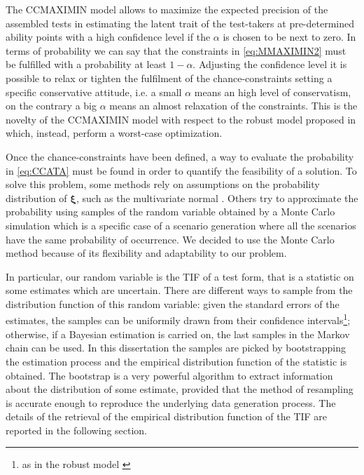 The CCMAXIMIN model allows to maximize the expected precision of the assembled tests in estimating the latent trait of the test-takers at pre-determined ability points with a high  confidence level if the $\alpha$ is chosen to be next to zero. In terms of probability we can say that the constraints in \eqref{eq:MMAXIMIN2} must be fulfilled with a probability at least $1-\alpha$. Adjusting the confidence level it is possible to relax or tighten the fulfilment of the chance-constraints setting a specific conservative attitude, i.e. a small $\alpha$ means an high level of conservatism, on the contrary a big $\alpha$ means an almost relaxation of the constraints. This is the novelty of the CCMAXIMIN model with respect to the robust model proposed in \textcite{veldkamp2013application,veldkamp2013uncertainties} which, instead, perform a worst-case optimization. 

Once the chance-constraints have been defined, a way to evaluate the probability in \eqref{eq:CCATA} must be found in order to quantify the feasibility of a solution. To solve this problem, some methods rely on assumptions on the probability distribution of $\boldsymbol{\xi}$, such as the multivariate normal \parencite{kim1990deterministic}. Others try to approximate the probability using samples of the random variable obtained by a Monte Carlo simulation \parencite{Ahmed2008} which is a specific case of a scenario generation where all the scenarios have the same probability of occurrence. 
We decided to use the Monte Carlo method because of its flexibility and adaptability to our problem. 

In particular, our random variable is the TIF of a test form, that  is a statistic on some estimates which are uncertain. There are different ways to sample from the distribution function of this random variable: given the standard errors of the estimates, the samples can be uniformily drawn from their confidence intervals\footnote{as in the robust model \parencite{veldkamp2013application}}; otherwise, if a Bayesian estimation is carried on, the last samples in the Markov chain can be used. In this dissertation the samples are picked by bootstrapping the estimation process and the empirical distribution function of the statistic is obtained. The bootstrap \parencite{efron1993} is a very powerful algorithm to extract information about the distribution of some estimate, provided that the method of resampling is accurate enough to reproduce the underlying data generation process. The details of the retrieval of the empirical distribution function of the TIF are reported in the following section.

